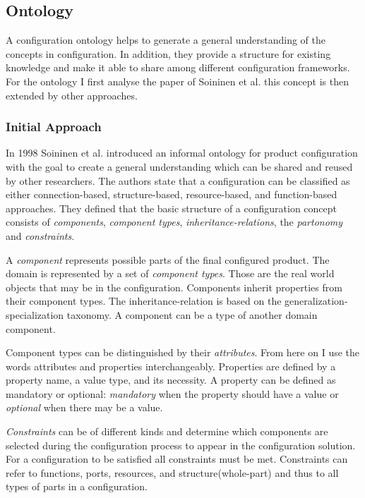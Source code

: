 \subsection{Ontology}

A configuration ontology helps to generate a general understanding of the concepts in configuration. In addition, they provide a structure for existing knowledge and make it able to share \cite{chjojoberi99a} among different configuration frameworks. For the ontology I first analyse the paper of Soininen et al. \cite{sotimasu98a} this concept is then extended by other approaches. 

\subsubsection{Initial Approach}
In 1998 Soininen et al. \cite{sotimasu98a} introduced an informal ontology for product configuration with the goal to create a general understanding which can be shared and reused by other researchers. The authors state that a configuration can be classified as either connection-based, structure-based, resource-based, and function-based approaches. They defined that the basic structure of a configuration concept consists of \textit{components}, \textit{component types}, \textit{inheritance-relations}, the \textit{partonomy} and \textit{constraints}. \newline

A \textit{component} represents possible parts of the final configured product. The domain is represented by a set of \textit{component types}. Those are the real world objects that may be in the configuration.
Components inherit properties from their component types. The inheritance-relation is based on the generalization-specialization taxonomy. A component can be a type of another domain component. \newline

Component types can be distinguished by their \textit{attributes}. From here on I use the words attributes and properties interchangeably. Properties are defined by a property name, a value type, and its necessity. A property can be defined as mandatory or optional: \textit{mandatory} when the property should have a value or \textit{optional} when there may be a value.\newline

\textit{Constraints} can be of different kinds and determine which components are selected during the configuration process to appear in the configuration solution. For a configuration to be satisfied all constraints must be met. Constraints can refer to functions, ports, resources, and structure(whole-part) and thus to all types of parts in a configuration.\newline

